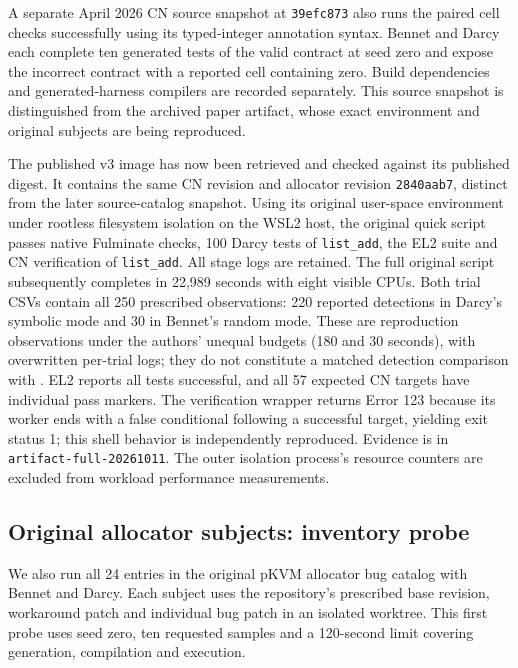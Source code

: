 A separate April 2026 CN source snapshot at \texttt{39efc873} also runs the
paired cell checks successfully using its typed-integer annotation syntax.
Bennet and Darcy each complete ten generated tests of the valid contract at
seed zero and expose the incorrect contract with a reported cell containing
zero. Build dependencies and generated-harness compilers are recorded
separately. This source snapshot is distinguished from the archived paper
artifact, whose exact environment and original subjects are being reproduced.

The published v3 image has now been retrieved and checked against its published
digest. It contains the same CN revision and allocator revision
\texttt{2840aab7}, distinct from the later source-catalog snapshot. Using its
original user-space environment under rootless filesystem isolation on the
WSL2 host, the original quick script passes native Fulminate checks, 100 Darcy
tests of \texttt{list\_add}, the EL2 suite and CN verification of
\texttt{list\_add}. All stage logs are retained. The full original script subsequently completes in 22,989 seconds with eight
visible CPUs. Both trial CSVs contain all 250 prescribed observations: 220
reported detections in Darcy's symbolic mode and 30 in Bennet's random mode.
These are reproduction observations under the authors' unequal budgets
(180 and 30 seconds), with overwritten per-trial logs; they do not constitute
a matched detection comparison with \tespec{}. EL2 reports all tests successful,
and all 57 expected CN targets have individual pass markers. The verification
wrapper returns Error 123 because its worker ends with a false conditional
following a successful target, yielding exit status 1; this shell behavior
is independently reproduced. Evidence is in \texttt{artifact-full-20261011}.
The outer isolation process's resource counters are excluded from workload
performance measurements.

\subsection{Original allocator subjects: inventory probe}

We also run all 24 entries in the original pKVM allocator bug catalog with
Bennet and Darcy. Each subject uses the repository's prescribed base revision,
workaround patch and individual bug patch in an isolated worktree. This first
probe uses seed zero, ten requested samples and a 120-second limit covering
generation, compilation and execution.


